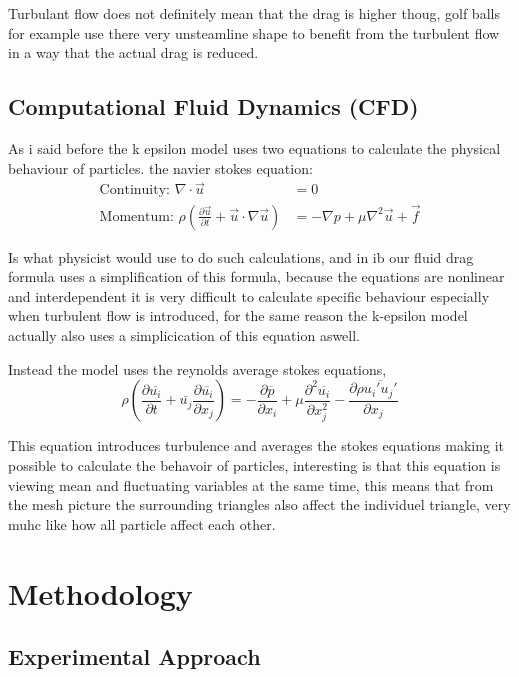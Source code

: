 \documentclass[12pt,a4paper]{article}
\begin{document}
Turbulant flow does not definitely mean that the drag is higher thoug, golf balls for example use there very unsteamline shape to benefit from the turbulent flow in a way that the actual drag is reduced.

\subsection{Computational Fluid Dynamics (CFD)}

As i said before the k epsilon model uses two equations to calculate the physical behaviour of particles.
the navier stokes equation: 
\begin{align}
\text{Continuity: } \nabla \cdot \vec{u} &= 0\\
\text{Momentum: } \rho\left(\frac{\partial \vec{u}}{\partial t} + \vec{u} \cdot \nabla \vec{u}\right) &= -\nabla p + \mu \nabla^2 \vec{u} + \vec{f}
\end{align}

Is what physicist would use to do such calculations, and in ib our fluid drag formula uses a simplification of this formula, because the equations are nonlinear and interdependent it is very difficult to calculate specific behaviour especially when turbulent flow is introduced, for the same reason the k-epsilon model actually also uses a simplicication of this equation aswell.

Instead the model uses the reynolds average stokes equations,
\begin{equation}
\rho\left(\frac{\partial \overline{u_i}}{\partial t} + \overline{u_j}\frac{\partial \overline{u_i}}{\partial x_j}\right) = -\frac{\partial \overline{p}}{\partial x_i} + \mu\frac{\partial^2 \overline{u_i}}{\partial x_j^2} - \frac{\partial \rho\overline{u_i' u_j'}}{\partial x_j}
\end{equation}

This equation introduces turbulence and averages the stokes equations making it possible to calculate the behavoir of particles, interesting is that this equation is viewing mean and fluctuating variables at the same time, this means that from the mesh picture the surrounding triangles also affect the individuel triangle, very muhc like how all particle affect each other.

\section{Methodology}

\subsection{Experimental Approach}
\end{document}
